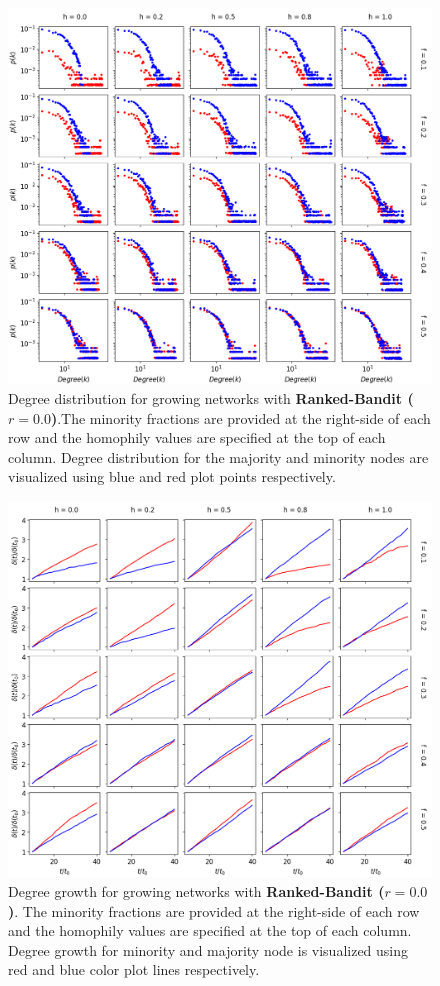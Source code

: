 \begin{appendices}
\begin{figure}[h!]
	\centering
	\includegraphics[width=1.0\textwidth]{images/dd_growth_rb00.png}
	\caption{Degree distribution for growing networks with \textbf{Ranked-Bandit ($r = 0.0$)}.The minority fractions are provided at the right-side of each row and the homophily values are specified at the top of each column. Degree distribution for the majority and minority nodes are visualized using blue and red plot points respectively.}
	\label{dd_growth_rb00_fig}
\end{figure}

\begin{figure}[h!]
	\centering
	\includegraphics[width=1.0\textwidth]{images/dg_growth_rb00.png}
	\caption{Degree growth for growing networks with \textbf{Ranked-Bandit ($r = 0.0$)}. The minority fractions are provided at the right-side of each row and the homophily values are specified at the top of each column. Degree growth for minority and majority node is visualized using red and blue color plot lines respectively.}
	\label{dg_growth_rb00_fig}
\end{figure}


\end{appendices}
